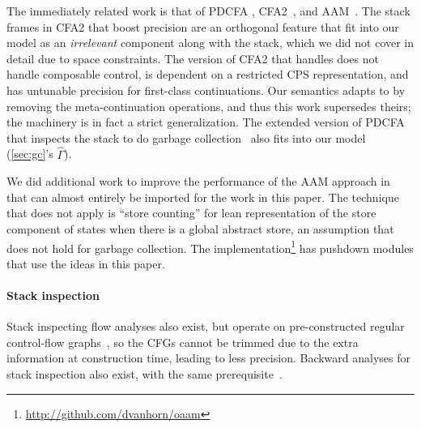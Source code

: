 The immediately related work is that of PDCFA \citep{dvanhorn:Earl2010Pushdown, dvanhorn:Earl2012Introspective}, CFA2~\citep{ianjohnson:vardoulakis-lmcs11, ianjohnson:Vardoulakis2011Pushdown}, and AAM~\citep{dvanhorn:VanHorn2010Abstracting}.
%
The stack frames in CFA2 that boost precision are an orthogonal feature that fit into our model as an \emph{irrelevant} component along with the stack, which we did not cover in detail due to space constraints.
%
The version of CFA2 that handles  does not handle composable control, is dependent on a restricted CPS representation, and has untunable precision for first-class continuations.
%
Our semantics adapts to  by removing the meta-continuation operations, and thus this work supersedes theirs; the machinery is in fact a strict generalization.
%
The extended version of PDCFA that inspects the stack to do garbage collection~\citep{dvanhorn:Earl2012Introspective} also fits into our model (\autoref{sec:gc}'s $\hat\Gamma$).
%

We did additional work to improve the performance of the AAM approach in \citet{ianjohnson:oaam:icfp2013} that can almost entirely be imported for the work in this paper.
%
The technique that does not apply is ``store counting'' for lean representation of the store component of states when there is a global abstract store, an assumption that does not hold for garbage collection.
%
The implementation\footnote{\url{http://github.com/dvanhorn/oaam}} has pushdown modules that use the ideas in this paper.

\paragraph{Stack inspection}
Stack inspecting flow analyses also exist, but operate on pre-constructed regular control-flow graphs~\citep{ianjohnson:bartoletti2004stack}, so the CFGs cannot be trimmed due to the extra information at construction time, leading to less precision.
%
Backward analyses for stack inspection also exist, with the same prerequisite~\citep{ianjohnson:DBLP:journals/sigplan/Chang06}.

